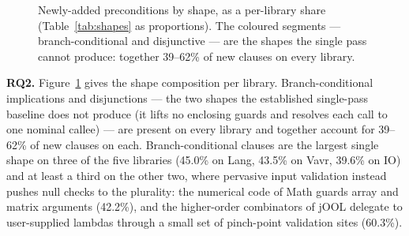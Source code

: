 \begin{figure}[t]
\centering
{}
\caption{Newly-added preconditions by shape, as a per-library share
(Table~\ref{tab:shapes} as proportions). The coloured segments ---
branch-conditional and disjunctive --- are the shapes the single pass
cannot produce: together 39--62\% of new clauses on every library.}
\label{fig:shapes}
\end{figure}

\textbf{RQ2.} Figure~\ref{fig:shapes} gives the shape composition per
library. Branch-conditional implications and disjunctions --- the two
shapes the established single-pass baseline does not produce (it lifts
no enclosing guards and resolves each call to one nominal callee) ---
are present on every library and together account for 39--62\% of new
clauses on each. Branch-conditional clauses are the largest single
shape on three of the five libraries (45.0\% on Lang, 43.5\% on Vavr,
39.6\% on IO) and at least a third on the other two, where pervasive
input validation instead pushes null checks to the plurality: the
numerical code of Math guards array and matrix arguments (42.2\%), and
the higher-order combinators of jOOL delegate to user-supplied lambdas
through a small set of pinch-point validation sites (60.3\%).

